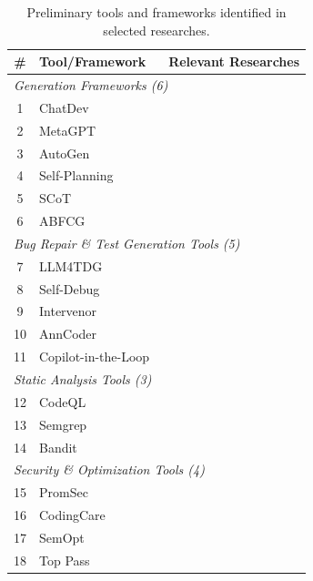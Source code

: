 \documentclass[11pt,a4paper]{article}
\begin{document}
\begin{table}[H]
\centering
\caption{Preliminary tools and frameworks identified in selected researches.}
\label{tab:tools_prelim}
\small
\begin{tabular}{@{}clp{8cm}@{}}
\toprule
\textbf{\#} & \textbf{Tool/Framework} & \textbf{Relevant Researches} \\
\midrule
\multicolumn{3}{l}{\textit{Generation Frameworks (6)}} \\
\midrule
1 & ChatDev~\cite{qian2023chatdev} & \cite{bai2025agent,zhang2025anncoder} \\
2 & MetaGPT~\cite{hong2023metagpt} & \cite{zhang2025anncoder,ding2025codingcare} \\
3 & AutoGen~\cite{wu2023autogen} & \cite{bai2025agent,frenkel2025apr} \\
4 & Self-Planning~\cite{jiang2024selfplan} & \cite{jiang2024selfplan} \\
5 & SCoT~\cite{li2025scot} & \cite{li2025scot} \\
6 & ABFCG~\cite{zhang2025abfcg} & \cite{zhang2025abfcg} \\
\midrule
\multicolumn{3}{l}{\textit{Bug Repair \& Test Generation Tools (5)}} \\
\midrule
7 & LLM4TDG~\cite{liu2025llm4tdg} & \cite{liu2025llm4tdg} \\
8 & Self-Debug~\cite{chen2023selfdebug} & \cite{chen2023selfdebug,dou2026} \\
9 & Intervenor~\cite{wang2024intervenor} & \cite{wang2024intervenor,dou2026} \\
10 & AnnCoder~\cite{zhang2025anncoder} & \cite{zhang2025anncoder} \\
11 & Copilot-in-the-Loop~\cite{zhang2024copilot} & \cite{zhang2024copilot} \\
\midrule
\multicolumn{3}{l}{\textit{Static Analysis Tools (3)}} \\
\midrule
12 & CodeQL & \cite{bruni2025,ding2025codingcare,bai2025agent} \\
13 & Semgrep & \cite{bruni2025,zhao2025semopt,ding2025codingcare} \\
14 & Bandit & \cite{ding2025codingcare} \\
\midrule
\multicolumn{3}{l}{\textit{Security \& Optimization Tools (4)}} \\
\midrule
15 & PromSec~\cite{nazzal2024promsec} & \cite{nazzal2024promsec} \\
16 & CodingCare~\cite{ding2025codingcare} & \cite{ding2025codingcare} \\
17 & SemOpt~\cite{zhao2025semopt} & \cite{zhao2025semopt} \\
18 & Top Pass~\cite{lyu2025toppass} & \cite{lyu2025toppass} \\
\bottomrule
\end{tabular}
\end{table}
\end{document}
